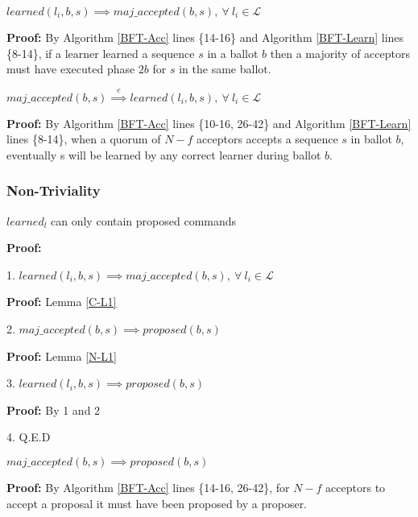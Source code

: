 \begin{lemma}
$learned(l_i,b,s) \implies maj\_accepted(b,s),\ \forall\ l_i \in \mathcal{L}$ \label{C-L1} \par
\end{lemma} 
\textbf{Proof:} By Algorithm \ref{BFT-Acc} lines \{14-16\} and Algorithm \ref{BFT-Learn} lines \{8-14\}, if a learner learned a sequence $s$ in a ballot $b$ then a majority of acceptors must have executed phase $2b$ for $s$ in the same ballot.

\begin{lemma}
$maj\_accepted(b,s) \overset{e}{\implies} learned(l_i,b,s),\ \forall\ l_i \in \mathcal{L}$ \label{C-L2} \par
\end{lemma}
\textbf{Proof:} By Algorithm \ref{BFT-Acc} lines \{10-16, 26-42\} and Algorithm \ref{BFT-Learn} lines \{8-14\}, when a quorum of $N-f$ acceptors accepts a sequence $s$ in ballot $b$, eventually s will be learned by any correct learner during ballot $b$.

\subsubsection{Non-Triviality}
\begin{theorem}
$learned_l$ can only contain proposed commands \label{N-T1} \par
\end{theorem} 
\textbf{Proof:} \par
1. $learned(l_i,b,s) \implies maj\_accepted(b,s),\ \forall\ l_i \in \mathcal{L}$ \par
\indent\indent\textbf{Proof:} Lemma \ref{C-L1} \par
2. $maj\_accepted(b,s) \implies proposed(b,s)$ \par
\indent\indent\textbf{Proof:} Lemma \ref{N-L1}\par
3. $learned(l_i,b,s) \implies proposed(b,s)$ \par
\indent\indent\textbf{Proof:} By 1 and 2 \par
4. Q.E.D \par

\begin{lemma}
$maj\_accepted(b,s) \implies proposed(b,s)$ \label{N-L1} \par
\end{lemma}
\textbf{Proof:} By Algorithm \ref{BFT-Acc} lines \{14-16, 26-42\}, for $N-f$ acceptors to accept a proposal it must have been proposed by a proposer.

